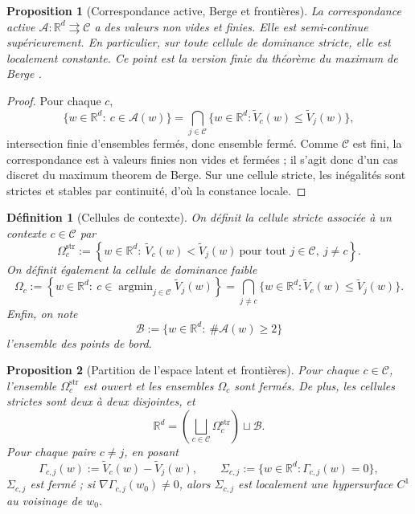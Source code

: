 \documentclass[11pt,a4paper]{article}
\newtheorem{definition}{Définition}[section]
\newtheorem{proposition}{Proposition}[section]
\DeclareMathOperator{\argmin}{argmin}
\newcommand{\R}{\mathbb R}
\newcommand{\Ccal}{\mathcal C}
\newcommand{\Acal}{\mathcal A}
\newcommand{\Bcal}{\mathcal B}
\begin{document}
\begin{proposition}[Correspondance active, Berge et frontières]
La correspondance active \(\Acal:\R^d\rightrightarrows\Ccal\) a des valeurs non vides et finies. Elle est semi-continue supérieurement. En particulier, sur toute cellule de dominance stricte, elle est localement constante. Ce point est la version finie du théorème du maximum de Berge \cite{Berge1963}.
\end{proposition}

\begin{proof}
Pour chaque \(c\),
\[
\{w\in\R^d:\ c\in\Acal(w)\}
=
\bigcap_{j\in\Ccal}\{w\in\R^d:\widetilde V_c(w)\le \widetilde V_j(w)\},
\]
intersection finie d'ensembles fermés, donc ensemble fermé. Comme \(\Ccal\) est fini, la correspondance est à valeurs finies non vides et fermées ; il s'agit donc d'un cas discret du maximum theorem de Berge. Sur une cellule stricte, les inégalités sont strictes et stables par continuité, d'où la constance locale.
\end{proof}

\begin{definition}[Cellules de contexte]
On définit la cellule stricte associée à un contexte \(c\in\Ccal\) par
\[
\Omega_c^{\mathrm{str}}:=\left\{w\in\R^d:\ \widetilde V_c(w)<\widetilde V_j(w)\ \text{pour tout }j\in\Ccal,\ j\neq c\right\}.
\]
On définit également la cellule de dominance faible
\[
\Omega_c:=\left\{w\in\R^d:\ c\in\argmin_{j\in\Ccal}\widetilde V_j(w)\right\}
=
\bigcap_{j\neq c}\{w\in\R^d:\widetilde V_c(w)\le \widetilde V_j(w)\}.
\]
Enfin, on note
\[
\Bcal:=\{w\in\R^d:\ \#\Acal(w)\ge 2\}
\]
l'ensemble des points de bord.
\end{definition}

\begin{proposition}[Partition de l'espace latent et frontières]
Pour chaque \(c\in\Ccal\), l'ensemble \(\Omega_c^{\mathrm{str}}\) est ouvert et les ensembles \(\Omega_c\) sont fermés. De plus, les cellules strictes sont deux à deux disjointes, et
\[
\R^d=\left(\bigsqcup_{c\in\Ccal}\Omega_c^{\mathrm{str}}\right)\sqcup \Bcal.
\]
Pour chaque paire \(c\neq j\), en posant
\[
\Gamma_{c,j}(w):=\widetilde V_c(w)-\widetilde V_j(w),
\qquad
\Sigma_{c,j}:=\{w\in\R^d:\Gamma_{c,j}(w)=0\},
\]
\(\Sigma_{c,j}\) est fermé ; si \(\nabla\Gamma_{c,j}(w_0)\neq 0\), alors \(\Sigma_{c,j}\) est localement une hypersurface \(C^1\) au voisinage de \(w_0\).
\end{proposition}
\end{document}
